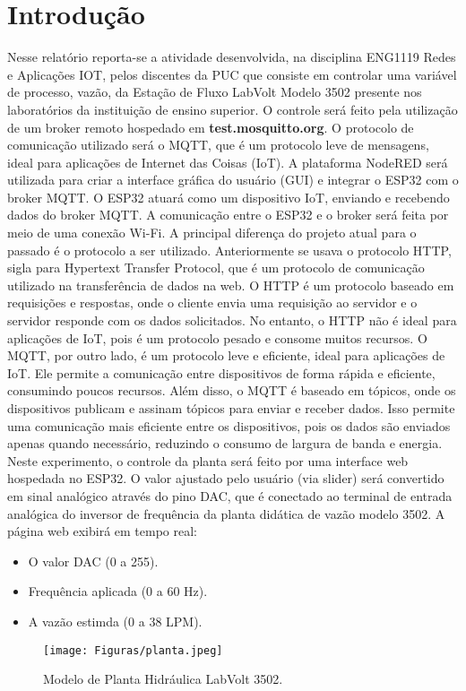 \documentclass[a4paper,12pt]{article}
\begin{document}
\section{Introdução}
\par Nesse relatório reporta-se a atividade desenvolvida, na disciplina ENG1119 Redes e Aplicações IOT, pelos discentes da PUC que consiste em controlar uma variável de processo, vazão, da
Estação de Fluxo LabVolt Modelo 3502 presente nos laboratórios da instituição de ensino superior. O controle será feito pela utilização de um  broker remoto hospedado em \textbf{test.mosquitto.org}. O protocolo de comunicação utilizado será o MQTT, que é um protocolo leve de mensagens, ideal para aplicações de Internet das Coisas (IoT). A plataforma NodeRED será utilizada para criar a interface gráfica do usuário (GUI) e integrar o ESP32 com o broker MQTT. O ESP32 atuará como um dispositivo IoT, enviando e recebendo dados do broker MQTT. A comunicação entre o ESP32 e o broker será feita por meio de uma conexão Wi-Fi. A principal diferença do projeto atual para o passado é o protocolo a ser utilizado. Anteriormente se usava o protocolo HTTP, sigla para Hypertext Transfer Protocol, que é um protocolo de comunicação utilizado na transferência de dados na web. O HTTP é um protocolo baseado em requisições e respostas, onde o cliente envia uma requisição ao servidor e o servidor responde com os dados solicitados. No entanto, o HTTP não é ideal para aplicações de IoT, pois é um protocolo pesado e consome muitos recursos. O MQTT, por outro lado, é um protocolo leve e eficiente, ideal para aplicações de IoT. Ele permite a comunicação entre dispositivos de forma rápida e eficiente, consumindo poucos recursos. Além disso, o MQTT é baseado em tópicos, onde os dispositivos publicam e assinam tópicos para enviar e receber dados. Isso permite uma comunicação mais eficiente entre os dispositivos, pois os dados são enviados apenas quando necessário, reduzindo o consumo de largura de banda e energia. \\
Neste experimento, o controle da planta será feito por uma interface web hospedada no ESP32. O
valor ajustado pelo usuário (via slider) será convertido em sinal analógico através do pino DAC, que
é conectado ao terminal de entrada analógica do inversor de frequência da planta didática de vazão
modelo 3502. A página web exibirá em tempo real:
\begin{itemize}
    \item O valor DAC (0 a 255).
    \item Frequência aplicada (0 a 60 Hz).
    \item A vazão estimda (0 a 38 LPM).
\end{itemize}
\begin{figure}[H]
    \centering
    \texttt{[image: Figuras/planta.jpeg]}
    \caption{Modelo de Planta Hidráulica LabVolt 3502.}
    \label{fig:planta}
\end{figure}
\end{document}
